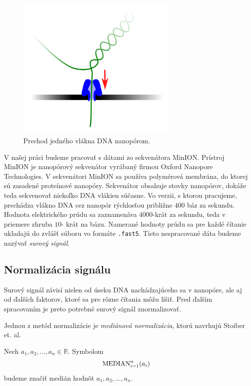 \begin{figure}[t]
\centerline{\includegraphics[width=0.7\textwidth]{images/nanopor}}
\caption{Prechod jedného vlákna DNA nanopórom.}
\label{fig:nanopor}
\end{figure}

V našej práci budeme pracovať s dátami zo sekvenátora MinION.
Prístroj MinION je nanopórový sekvenátor vyrábaný firmou Oxford Nanopore Technologies.
V sekvenátori MinION sa používa polymérová membrána, do ktorej sú 
zasadené proteínové nanopóry. Sekvenátor obsahuje stovky nanopórov, dokáže teda sekvenovať niekoľko DNA 
vlákien súčasne.
Vo verzii, s ktorou pracujeme, prechádza vlákno DNA cez nanopór rýchlosťou približne $400$ báz za 
sekundu. Hodnota elektrického prúdu sa zaznamenáva $4000$-krát za sekundu, teda v priemere zhruba $10$-
krát na bázu. Namerané hodnoty prúdu sa pre každé čítanie ukladajú do zvlášť súboru vo formáte 
\texttt{.fast5}. Tieto nespracované dáta budeme nazývať \emph{surový signál}.

\subsection{Normalizácia signálu}

Surový signál závisí nielen od úseku DNA nachádzajúceho sa v nanopóre, ale aj od ďalších faktorov, ktoré 
sa pre rôzne čítania môžu líšiť. Pred ďalším spracovaním je preto potrebné surový signál znormalizovať.

Jednou z metód normalizácie je \emph{mediánová normalizácia}, ktorú navrhujú Stoiber et. al. \cite{Stoiber2017}

\begin{definicia}
Nech $a_1, a_2, \dots, a_n \in \mathbb{R}$. Symbolom
$$\mathrm{MEDIAN}_{i=1}^{n}(a_i)$$
budeme značiť medián hodnôt $a_1, a_2, \dots, a_n$.
\end{definicia}

